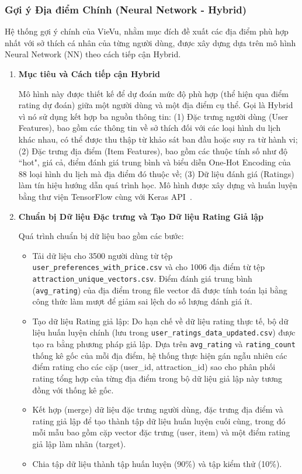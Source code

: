 \subsubsection{Gợi ý Địa điểm Chính (Neural Network - Hybrid)}
\label{subsubsec:nn_recsys_impl_final} %

Hệ thống gợi ý chính của VieVu, nhằm mục đích đề xuất các địa điểm phù hợp nhất với sở thích cá nhân của từng người dùng, được xây dựng dựa trên mô hình Neural Network (NN) theo cách tiếp cận Hybrid.
\begin{enumerate}
    \item \textbf{Mục tiêu và Cách tiếp cận Hybrid}
    
Mô hình này được thiết kế để dự đoán mức độ phù hợp (thể hiện qua điểm rating dự đoán) giữa một người dùng và một địa điểm cụ thể. Gọi là Hybrid vì nó sử dụng kết hợp ba nguồn thông tin: (1) Đặc trưng người dùng (User Features), bao gồm các thông tin về sở thích đối với các loại hình du lịch khác nhau, có thể được thu thập từ khảo sát ban đầu hoặc suy ra từ hành vi; (2) Đặc trưng địa điểm (Item Features), bao gồm các thuộc tính số như độ ``hot", giá cả, điểm đánh giá trung bình và biểu diễn One-Hot Encoding của 88 loại hình du lịch mà địa điểm đó thuộc về; (3) Dữ liệu đánh giá (Ratings) làm tín hiệu hướng dẫn quá trình học. Mô hình được xây dựng và huấn luyện bằng thư viện TensorFlow cùng với Keras API~\cite{tensorflow_lib, keras_lib}.
    
    \item \textbf{Chuẩn bị Dữ liệu Đặc trưng và Tạo Dữ liệu Rating Giả lập}

Quá trình chuẩn bị dữ liệu bao gồm các bước:
    \begin{itemize}
        \item Tải dữ liệu cho 3500 người dùng từ tệp \texttt{user\_preferences\_with\_price.csv} và cho 1006 địa điểm từ tệp \texttt{attraction\_unique\_vectors.csv}. Điểm đánh giá trung bình (\texttt{avg\_rating}) của địa điểm trong file vector đã được tính toán lại bằng công thức làm mượt để giảm sai lệch do số lượng đánh giá ít.
        \item Tạo dữ liệu Rating giả lập: Do hạn chế về dữ liệu rating thực tế, bộ dữ liệu huấn luyện chính (lưu trong \texttt{user\_ratings\_data\_updated.csv}) được tạo ra bằng phương pháp giả lập. Dựa trên \texttt{avg\_rating} và \texttt{rating\_count} thống kê gốc của mỗi địa điểm, hệ thống thực hiện gán ngẫu nhiên các điểm rating cho các cặp (user\_id, attraction\_id) sao cho phân phối rating tổng hợp của từng địa điểm trong bộ dữ liệu giả lập này tương đồng với thống kê gốc.
        \item Kết hợp (merge) dữ liệu đặc trưng người dùng, đặc trưng địa điểm và rating giả lập để tạo thành tập dữ liệu huấn luyện cuối cùng, trong đó mỗi mẫu bao gồm cặp vector đặc trưng (user, item) và một điểm rating giả lập làm nhãn (target).
        \item Chia tập dữ liệu thành tập huấn luyện (90\%) và tập kiểm thử (10\%).
    \end{itemize}
    

\end{enumerate}
